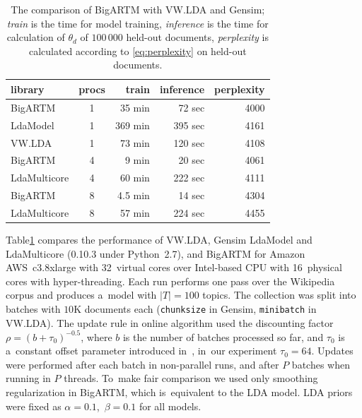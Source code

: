 \documentclass{acm_proc_article-sp}
\begin{document}
\begin{table}[t]
	\caption{
        The comparison of BigARTM with VW.LDA and Gensim;
        \emph{train} is the time for model training,
        \emph{inference} is the time for calculation of $\theta_d$ of $100\,000$ held-out documents,
        \emph{perplexity} is calculated according to \eqref{eq:perplexity} on held-out documents.
    }
	\label{tab:libraries_comparison}
    \centering\tabcolsep=4.3pt
	\begin{tabular}[t]{l|c|rrr}
	\hline
	library & procs & train & inference & perplexity \\
	\hline
	BigARTM & 1 & 35 min & 72 sec & 4000 \\
	LdaModel & 1 & 369 min & 395 sec & 4161  \\
	VW.LDA & 1 & 73 min & 120 sec & 4108 \\
	\hline
	BigARTM & 4 & 9 min & 20 sec & 4061  \\
	LdaMulticore & 4 & 60 min & 222 sec & 4111  \\	
	\hline
	BigARTM & 8 & 4.5 min & 14 sec & 4304  \\
	LdaMulticore & 8 & 57 min & 224 sec & 4455 \\
	\hline
	\end{tabular}
\end{table}
%

Table\;\ref{tab:libraries_comparison} compares the performance of
VW.LDA, Gensim LdaModel and LdaMulticore (\mbox{0.10.3} under Python~\mbox{2.7}), and BigARTM
for Amazon AWS~c3.8xlarge with 32~virtual cores over
Intel-based CPU with 16~physical cores with hyper-threading.
%
Each run performs one pass over the Wikipedia corpus and produces a~model with $|T|=100$ topics.
The collection was split into batches with $10$K documents each
(\texttt{chunksize} in Gensim, \texttt{minibatch} in VW.LDA).
The update rule in online algorithm used the discounting factor
${\rho = (b + \tau_0)^{-0.5}}$,
where $b$ is the number of batches processed so far,
and $\tau_0$ is a~constant offset parameter introduced in~\cite{hoffman10online},
in~our experiment ${\tau_0 = 64}$.
\mbox{Updates} were performed after each batch in non-parallel runs, and after $P$ batches when running in $P$ threads.
To~make fair comparison we used only smoothing regularization in BigARTM, which is~equivalent to the LDA model.
LDA priors were fixed as ${\alpha = 0.1}$,\, ${\beta = 0.1}$ for all models.
\end{document}
